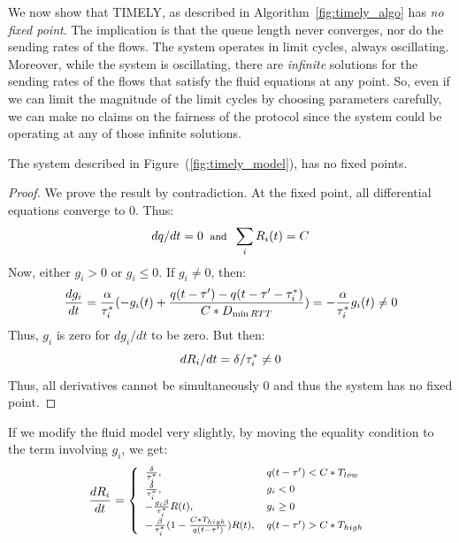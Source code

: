 We now show that TIMELY, as described
in Algorithm~\ref{fig:timely_algo} has \emph{no fixed point}. The implication
is that the queue length never converges, nor do the sending rates of the flows.
The system operates in limit cycles, always oscillating. Moreover, while the
system is oscillating, there are \emph{infinite} solutions for the sending rates
of the flows that satisfy the fluid equations at any point. So, even if we can
limit the magnitude of the limit cycles by choosing parameters carefully, we can
make no claims on the fairness of the protocol since the system could be
operating at any of those infinite solutions.

\begin{thm} 
\label{thm:nofixed}
The system described in Figure~(\ref{fig:timely_model}), has no fixed points.
\end{thm}
\begin{proof}
We prove the result by contradiction. At the fixed point, all
differential equations converge to 0. Thus:
\begin{equation}
\small
{dq}/{dt} = 0 \; \; \mbox{and} \; \;  \sum_{i} R_i(t) =  C
\end{equation} 
Now, either $g_i > 0$ or $g_i  \le 0$. If $g_i \ne 0$, then:
\begin{equation}
\small
\frac{{dg_i}}{{dt}} =  \frac{\alpha }{{\tau_i^*}}( - g_i(t) + \frac{{q(t
                        - \tau ') - q(t - \tau ' - \tau_i^*
                        )}}{{C*{D_{\min RTT}}}})\\
 =   -\frac{\alpha }{{\tau_i^*}} g_i(t)  \ne  0
\end{equation}
Thus, $g_i$ is zero for $dg_i/dt$ to be zero. But then:
\begin{equation}
\small
{dR_i}/{dt} =  {\delta }/{{\tau_i^*}} \ne 0
\end{equation}
Thus, all derivatives cannot be simultaneously 0 and thus the system has no fixed
point.
\end{proof}

If we modify the fluid model very slightly, by moving the equality condition to
the term involving $g_i$, we get:
\begin{equation}
\small
\frac{{dR_i}}{{dt}} = \left\{ \begin{array}{ll}
\frac{\delta }{{\tau_i^*}}, & q(t - \tau ') < C*{T_{low}}\\
\frac{\delta }{{\tau_i^*}}, & g_i < 0\\
 - \frac{{g_i\beta }}{{\tau_i^*}}R(t), & g_i \ge 0\\
 - \frac{\beta }{{\tau_i^*}}(1 - \frac{{C*{T_{high}}}}{{q(t - \tau ')}})R(t), & q(t - \tau ') > C*{T_{high}}
\end{array} \right.\\
\label{eq:timely_r_modified}
\end{equation}

